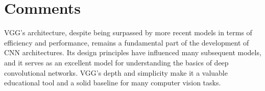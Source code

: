 \section{Comments}
VGG's architecture, despite being surpassed by more recent models in terms of efficiency and performance, remains a fundamental part of the development of CNN architectures. Its design principles have influenced many subsequent models, and it serves as an excellent model for understanding the basics of deep convolutional networks. VGG's depth and simplicity make it a valuable educational tool and a solid baseline for many computer vision tasks.
